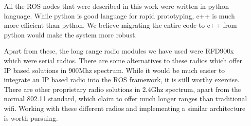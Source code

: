 All the ROS nodes that were described in this work were written in python language. While python is good language for rapid prototyping, c++ is much  more efficient than python. We believe migrating the entire code to c++ from python would make the system more robust.

Apart from these, the long range radio modules we have used were RFD900x which were serial radios. There are some alternatives to these radios which offer IP based solutions in 900Mhz spectrum. While it would be much easier to integrate an IP based radio into the ROS framework, it is still worthy exercise. There are other proprietary radio solutions in 2.4Ghz spectrum, apart from the normal 802.11 standard, which claim to offer much longer ranges than traditional wifi. Working with these different radios and implementing a similar architecture is worth pursuing.